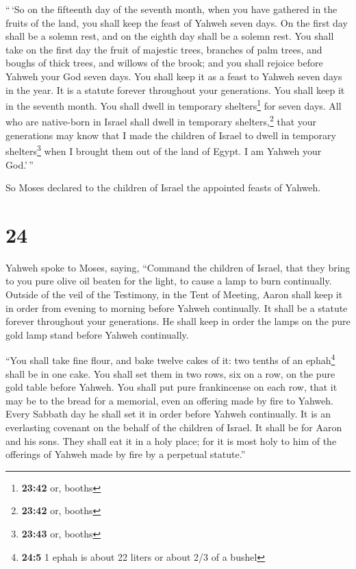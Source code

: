  ``\,`So on the fifteenth day of the seventh month, when
you have gathered in the fruits of the land, you shall keep the feast of
Yahweh seven days. On the first day shall be a solemn rest, and on the
eighth day shall be a solemn rest.  You shall take on the
first day the fruit of majestic trees, branches of palm trees, and
boughs of thick trees, and willows of the brook; and you shall rejoice
before Yahweh your God seven days.  You shall keep it as
a feast to Yahweh seven days in the year. It is a statute forever
throughout your generations. You shall keep it in the seventh month.
 You shall dwell in temporary shelters\footnote{\textbf{23:42}
  or, booths} for seven days. All who are native-born in Israel shall
dwell in temporary shelters,\footnote{\textbf{23:42} or, booths}
 that your generations may know that I made the children
of Israel to dwell in temporary shelters\footnote{\textbf{23:43} or,
  booths} when I brought them out of the land of Egypt. I am Yahweh your
God.'\,''

 So Moses declared to the children of Israel the
appointed feasts of Yahweh.

\hypertarget{section-23}{%
\section{24}\label{section-23}}

 Yahweh spoke to Moses, saying,  ``Command
the children of Israel, that they bring to you pure olive oil beaten for
the light, to cause a lamp to burn continually.  Outside
of the veil of the Testimony, in the Tent of Meeting, Aaron shall keep
it in order from evening to morning before Yahweh continually. It shall
be a statute forever throughout your generations.  He
shall keep in order the lamps on the pure gold lamp stand before Yahweh
continually.

 ``You shall take fine flour, and bake twelve cakes of it:
two tenths of an ephah\footnote{\textbf{24:5} 1 ephah is about 22 liters
  or about 2/3 of a bushel} shall be in one cake.  You
shall set them in two rows, six on a row, on the pure gold table before
Yahweh.  You shall put pure frankincense on each row, that
it may be to the bread for a memorial, even an offering made by fire to
Yahweh.  Every Sabbath day he shall set it in order before
Yahweh continually. It is an everlasting covenant on the behalf of the
children of Israel.  It shall be for Aaron and his sons.
They shall eat it in a holy place; for it is most holy to him of the
offerings of Yahweh made by fire by a perpetual statute.''

